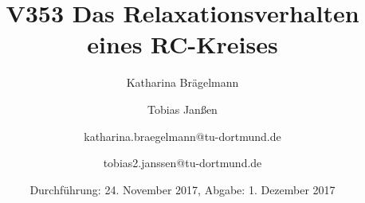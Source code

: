 
\title{V353 Das Relaxationsverhalten eines RC-Kreises}
\author{Katharina Brägelmann \and Tobias Janßen \and katharina.braegelmann@tu-dortmund.de \and tobias2.janssen@tu-dortmund.de}
\date{Durchführung: 24. November 2017, Abgabe: 1. Dezember 2017}
\maketitle
